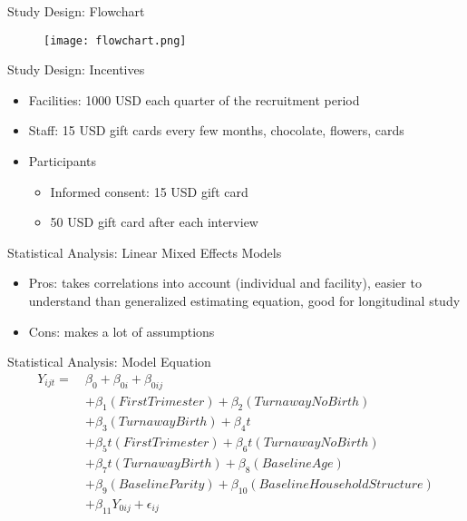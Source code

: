 \documentclass{beamer}
\begin{document}
\begin{frame}{Study Design: Flowchart}
    \begin{figure}
        \centering
        \texttt{[image: flowchart.png]}
    \end{figure}
\end{frame}

\begin{frame}{Study Design: Incentives}
    \begin{itemize}
        \item Facilities: 1000 USD each quarter of the recruitment period
    \end{itemize}
        \begin{itemize}
        \item Staff: 15 USD gift cards every few months, chocolate, flowers, cards
    \end{itemize}
    \begin{itemize}
        \item Participants
            \begin{itemize}
        \item Informed consent: 15 USD gift card
    \end{itemize}
        \begin{itemize}
        \item 50 USD gift card after each interview
    \end{itemize}
    \end{itemize}
\end{frame}

\begin{frame}{Statistical Analysis: Linear Mixed Effects Models}
    \begin{itemize}
    \item Pros: takes correlations into account (individual and facility), easier to understand than generalized estimating equation, good for longitudinal study
\end{itemize}
\begin{itemize}
    \item Cons: makes a lot of assumptions
\end{itemize}
\end{frame}

\begin{frame}{Statistical Analysis: Model Equation}
\begin{align*}
Y_{ijt} =\ & \beta_0 + \beta_{0i} + \beta_{0ij} \\
& + \beta_1 (First Trimester) + \beta_2 (Turnaway No Birth) \\
& + \beta_3 (Turnaway Birth) + \beta_4 t \\
& + \beta_5 t (First Trimester) + \beta_6 t (Turnaway No Birth) \\
& + \beta_7 t (Turnaway Birth) + \beta_8 (BaselineAge) \\
& + \beta_9 (BaselineParity) + \beta_{10} (BaselineHousehold Structure) \\
& + \beta_{11} Y_{0ij} + \epsilon_{ij}
\end{align*}
\end{frame}
\end{document}
